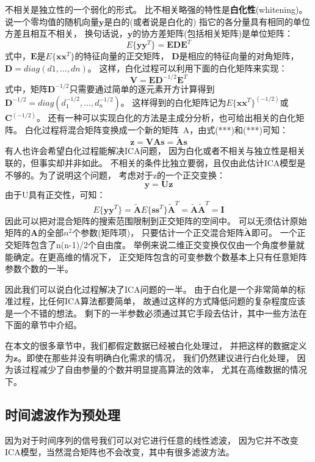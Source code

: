 不相关是独立性的一个弱化的形式。
比不相关略强的特性是\textbf{白化性}(whitening)。
说一个零均值的随机向量$\bm{y}$是白的(或者说是白化的)
指它的各分量具有相同的单位方差且相互不相关，
换句话说，$\bm{y}$的协方差矩阵(包括相关矩阵)是单位矩阵：
\begin{equation}
E\{\bm{yy}^T\}=\bm{EDE}^T
\end{equation}
式中，$\bm{E}$是$E\{\bm{xx}^T\}$的特征向量的正交矩阵，
$\bm{D}$是相应的特征向量的对角矩阵，$\bm{D}=diag(d1,...,dn)$。
这样，白化过程可以利用下面的白化矩阵来实现：
\begin{equation}
\bm{V}=\bm{ED}^{-1/2}\bm{E}^T
\end{equation}
式中，矩阵$\bm{D}^{-1/2}$只需要通过简单的逐元素开方计算得到
$\bm{D}^{-1/2}=diag(d_1^{-1/2},...,d_n^{-1/2})$。
这样得到的白化矩阵记为$E\{\bm{xx}^T\}^(-1/2)$或$\bm{C}^(-1/2)$。
还有一种可以实现白化的方法是主成分分析，也可给出相关的白化矩阵。
白化过程将混合矩阵变换成一个新的矩阵~A，由式(***)和(***)可知：
\begin{equation}
\bm{z=VAs=\tilde{A}s}
\end{equation}
有人也许会希望白化过程能解决ICA问题，
因为白化或者不相关与独立性是相关联的，但事实却并非如此。
不相关的条件比独立要弱，且仅由此估计ICA模型是不够的。为了说明这个问题，
考虑对于z的一个正交变换：
\begin{equation}
\bm{y=Uz}
\end{equation}
由于U具有正交性，可知：
\begin{equation}
E\{\bm{yy}^T\}
=\tilde{\bm{A}}E\{\bm{ss}^T\}\tilde{\bm{A}}^T
=\tilde{\bm{A}}\tilde{\bm{A}}^T=\bm{I}
\end{equation}
因此可以把对混合矩阵的搜索范围限制到正交矩阵的空间中。
可以无须估计原始矩阵的$\bm{A}$的全部$n^2$个参数(矩阵项)，
只要估计一个正交混合矩阵$\tilde{\bm{A}}$即可。
一个正交矩阵包含了n(n-1)/2个自由度。
举例来说二维正交变换仅仅由一个角度参量就能确定。在更高维的情况下，
正交矩阵包含的可变参数个数基本上只有任意矩阵参数个数的一半。

因此我们可以说白化过程解决了ICA问题的一半。
由于白化是一个非常简单的标准过程，比任何ICA算法都要简单，
故通过这样的方式降低问题的复杂程度应该是一个不错的想法。
剩下的一半参数必须通过其它手段去估计，其中一些方法在下面的章节中介绍。

在本文的很多章节中，我们都假定数据已经被白化处理过，
并把这样的数据定义为$\bm{z}$。即使在那些并没有明确白化需求的情况，
我们仍然建议进行白化处理，
因为该过程减少了自由参量的个数并明显提高算法的效率，
尤其在高维数据的情况下。
   
\subsection{时间滤波作为预处理}
因为对于时间序列的信号我们可以对它进行任意的线性滤波，
因为它并不改变ICA模型，当然混合矩阵也不会改变，其中有很多滤波方法。
    
